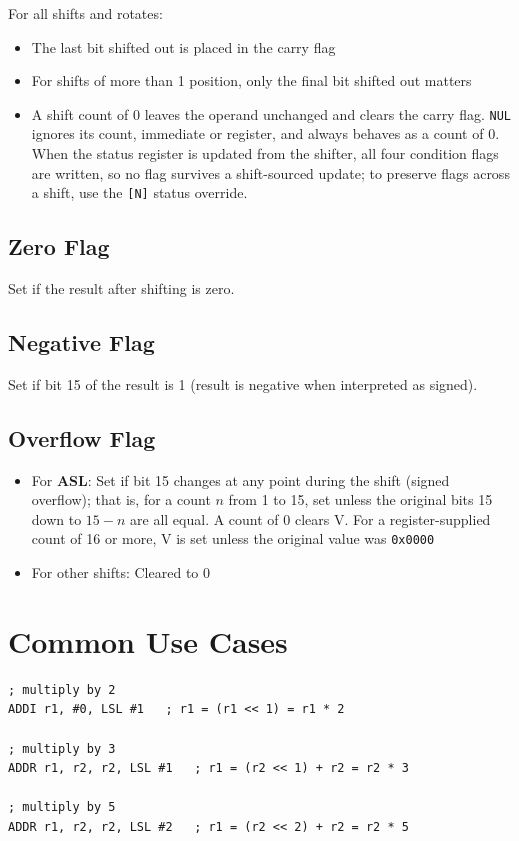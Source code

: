 For all shifts and rotates:
\begin{itemize}
	\item The last bit shifted out is placed in the carry flag
	\item For shifts of more than 1 position, only the final bit shifted out matters
	\item A shift count of 0 leaves the operand unchanged and clears the carry flag. \texttt{NUL} ignores its count, immediate or
	      register, and always behaves as a count of 0. When the status register is updated from the shifter, all four condition
	      flags are written, so no flag survives a shift-sourced update; to preserve flags across a shift, use the \texttt{[N]}
	      status override.
\end{itemize}

\subsection{Zero Flag}

Set if the result after shifting is zero.

\subsection{Negative Flag}

Set if bit 15 of the result is 1 (result is negative when interpreted as signed).

\subsection{Overflow Flag}

\begin{itemize}
	\item For \textbf{ASL}: Set if bit 15 changes at any point during the shift (signed overflow); that is, for a count $n$ from
	      1 to 15, set unless the original bits 15 down to $15 - n$ are all equal. A count of 0 clears V. For a register-supplied
	      count of 16 or more, V is set unless the original value was \texttt{0x0000}
	\item For other shifts: Cleared to 0
\end{itemize}

\section{Common Use Cases}

\begin{example}
	\begin{lstlisting}
; multiply by 2
ADDI r1, #0, LSL #1   ; r1 = (r1 << 1) = r1 * 2

; multiply by 3
ADDR r1, r2, r2, LSL #1   ; r1 = (r2 << 1) + r2 = r2 * 3

; multiply by 5
ADDR r1, r2, r2, LSL #2   ; r1 = (r2 << 2) + r2 = r2 * 5
	\end{lstlisting}
	\caption{Multiplication by Constants}
\end{example}

